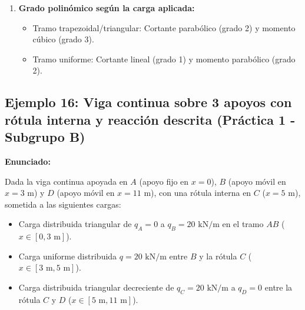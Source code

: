 {\begin{enumerate}
              \begin{itemize}

                  \item En el apoyo intermedio $B$ ($x = 3\text{ m}$): La reacción vertical ascendente $V_B = 70.00\text{ kN}$ produce un salto vertical ascendente en el cortante desde $Q(3^-) = -28.00\text{ kN}$ hasta $Q(3^+) = +42.00\text{ kN}$ ($\Delta Q = +70.00\text{ kN}$).

                  \item El momento flector es continuo en toda la pieza al no existir momentos concentrados aplicados.

              \end{itemize}



        \item \textbf{Grado polinómico según la carga aplicada:}

              \begin{itemize}

                  \item Tramo trapezoidal/triangular: Cortante parabólico (grado 2) y momento cúbico (grado 3).

                  \item Tramo uniforme: Cortante lineal (grado 1) y momento parabólico (grado 2).

              \end{itemize}

    \end{enumerate}

}



\subsection{Ejemplo 16: Viga continua sobre 3 apoyos con rótula interna y reacción descrita (Práctica 1 - Subgrupo B)}



\textbf{Enunciado:}

Dada la viga continua apoyada en $A$ (apoyo fijo en $x = 0$), $B$ (apoyo móvil en $x = 3\text{ m}$) y $D$ (apoyo móvil en $x = 11\text{ m}$), con una rótula interna en $C$ ($x = 5\text{ m}$), sometida a las siguientes cargas:

\begin{itemize}

    \item Carga distribuida triangular de $q_A = 0$ a $q_B = 20\text{ kN/m}$ en el tramo $AB$ ($x \in [0, 3\text{ m}]$).

    \item Carga uniforme distribuida $q = 20\text{ kN/m}$ entre $B$ y la rótula $C$ ($x \in [3\text{ m}, 5\text{ m}]$).

    \item Carga distribuida triangular decreciente de $q_C = 20\text{ kN/m}$ a $q_D = 0$ entre la rótula $C$ y $D$ ($x \in [5\text{ m}, 11\text{ m}]$).

\end{itemize}



